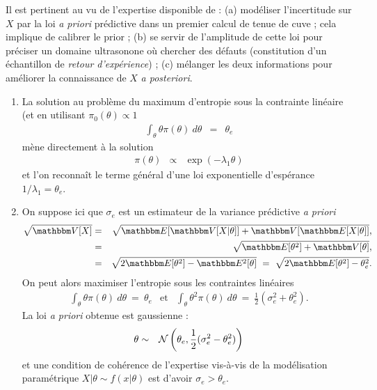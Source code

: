 \begin{rep}
Il est pertinent au vu de l'expertise disponible de : (a) modéliser l'incertitude sur $X$ par la loi {\it a priori} prédictive dans un premier calcul de tenue de cuve ; cela implique de calibrer le prior ; (b) se servir de l'amplitude de cette loi pour préciser un domaine ultrasonone où chercher des défauts (constitution d'un échantillon de \emph{retour d'expérience}) ; (c) mélanger les deux informations pour améliorer la connaissance de $X$ {\it a posteriori}.
\begin{enumerate}
    \item La solution au problème du maximum d'entropie sous la contrainte linéaire (et en utilisant $\pi_0(\theta)\propto 1$
\begin{eqnarray*}
\int_{\theta} \theta \pi(\theta) \ d\theta & = & \theta_e
\end{eqnarray*}
mène directement à la solution
\begin{eqnarray*}
\pi(\theta) & \propto & \exp(-\lambda_1\theta)
\end{eqnarray*}
et l'on reconnaît le terme général d'une loi exponentielle d'espérance $1/\lambda_1=\theta_e$. 
\item On suppose ici que $\sigma_e$ est un estimateur de la variance prédictive {\it a priori}
\begin{eqnarray*}
\sqrt{\Var[X]} & = & \sqrt{\E[\Var[X|\theta]] + \Var[\E[X|\theta]]}, \\
& = & \sqrt{\E[\theta^2] + \Var[\theta]}, \\
& = & \sqrt{2\E[\theta^2] - \E^2[\theta]} \ = \ \sqrt{2\E[\theta^2] -\theta^2_e}.
\end{eqnarray*}
On peut alors maximiser l'entropie sous les contraintes linéaires
\begin{eqnarray*}
\int_{\theta} \theta \pi(\theta) \ d\theta \ = \ \theta_e & \text{et} & \int_{\theta} \theta^2 \pi(\theta) \ d\theta \ = \ \frac{1}{2}(\sigma^2_e + \theta^2_e).
\end{eqnarray*}
La loi {\it a priori} obtenue est gaussienne :
\begin{eqnarray*}
\theta & \sim & {\cal{N}}\left(\theta_e, \frac{1}{2}(\sigma^2_e - \theta^2_e)\right)
\end{eqnarray*}
et une condition de cohérence de l'expertise vis-à-vis de la modélisation paramétrique $X|\theta\sim f(x|\theta)$ est d'avoir $\sigma_e>\theta_e$.
\end{enumerate}
\end{rep}